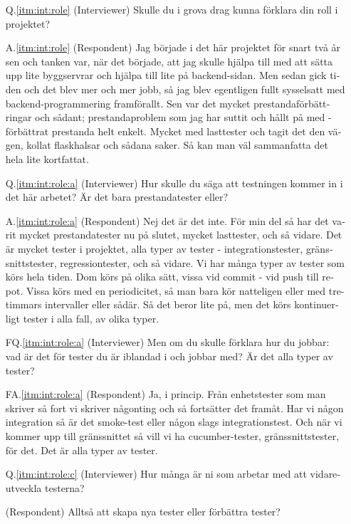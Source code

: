 \begin{otherlanguage}{swedish}
\begin{itemize}
  \item[Q.\ref{itm:int:role}] (Interviewer) Skulle du i grova drag kunna förklara din roll i projektet?
  \item[A.\ref{itm:int:role}] (Respondent) Jag började i det här projektet för snart två år sen och tanken var, när det började, att jag skulle hjälpa till med att sätta upp lite byggservrar och hjälpa till lite på backend-sidan. Men sedan gick tiden och det blev mer och mer jobb, så jag blev egentligen fullt sysselsatt med backend-programmering framförallt. Sen var det mycket prestandaförbättringar och sådant; prestandaproblem som jag har suttit och hållt på med - förbättrat prestanda helt enkelt. Mycket med lasttester och tagit det den vägen, kollat flaskhalsar och sådana saker. Så kan man väl sammanfatta det hela lite kortfattat.
  \item[Q.\ref{itm:int:role:a}] (Interviewer) Hur skulle du säga att testningen kommer in i det här arbetet? Är det bara prestandatester eller?
  \item[A.\ref{itm:int:role:a}] (Respondent) Nej det är det inte. För min del så har det varit mycket prestandatester nu på slutet, mycket lasttester, och så vidare. Det är mycket tester i projektet, alla typer av tester - integrationstester, gränssnittstester, regressiontester, och så vidare. Vi har många typer av tester som körs hela tiden. Dom körs på olika sätt, vissa vid commit - vid push till repot. Vissa körs med en periodicitet, så man bara kör natteligen eller med tre-timmars intervaller eller sådär. Så det beror lite på, men det körs kontinuerligt tester i alla fall, av olika typer.  
  \item[FQ.\ref{itm:int:role:a}] (Interviewer) Men om du skulle förklara hur du jobbar: vad är det för tester du är iblandad i och jobbar med? Är det alla typer av tester?
  \item[FA.\ref{itm:int:role:a}] (Respondent) Ja, i princip. Från enhetstester som man skriver så fort vi skriver någonting och så fortsätter det framåt. Har vi någon integration så är det smoke-test eller någon slags integrationstest. Och när vi kommer upp till gränssnittet så vill vi ha cucumber-tester, gränssnittstester, för det. Det är alla typer av tester.
  \item[Q.\ref{itm:int:role:c}] (Interviewer) Hur många är ni som arbetar med att vidareutveckla testerna?
  \item[] (Respondent) Alltså att skapa nya tester eller förbättra tester?

\end{itemize}
\end{otherlanguage}
